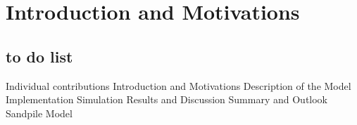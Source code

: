 \chapter{Introduction and Motivations}
\thispagestyle{fancy}


\section{to do list}

Individual contributions
Introduction and Motivations
Description of the Model
Implementation
Simulation Results and Discussion
Summary and Outlook
Sandpile Model




